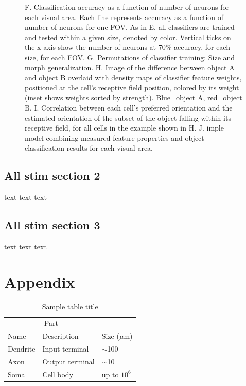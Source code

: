 \documentclass{article}
\begin{document}
\begin{figure}[ht]
  F.  Classification accuracy as a function of number of neurons for each visual area.  Each line represents accuracy as a function of number of neurons for one FOV.  As in E, all classifiers are trained and tested within a given size, denoted by color.  Vertical ticks on the x-axis show the number of neurons at 70\% accuracy, for each size, for each FOV.
  G.  Permutations of classifier training:  Size and morph generalization.
  H.  Image of the difference between object A and object B overlaid with density maps of classifier feature weights, positioned at the cell’s receptive field position, colored by its weight (inset shows weights sorted by strength).  Blue=object A, red=object B.
  I.  Correlation between each cell’s preferred orientation and the estimated orientation of the subset of the object falling within its receptive field, for all cells in the example shown in H.
  J.  imple model combining measured feature properties and object classification results for each visual area.
  \label{fig:fig5}
\end{figure}

\subsection{All stim section 2}
text text text

\subsection{All stim section 3}
text text text



\section{Appendix}

\begin{table}
 \caption{Sample table title}
  \centering
  \begin{tabular}{lll}
    \toprule
    \multicolumn{2}{c}{Part}                   \\
    \cmidrule(r){1-2}
    Name     & Description     & Size ($\mu$m) \\
    \midrule
    Dendrite & Input terminal  & $\sim$100     \\
    Axon     & Output terminal & $\sim$10      \\
    Soma     & Cell body       & up to $10^6$  \\
    \bottomrule
  \end{tabular}
  \label{tab:table}
\end{table}
\end{document}
